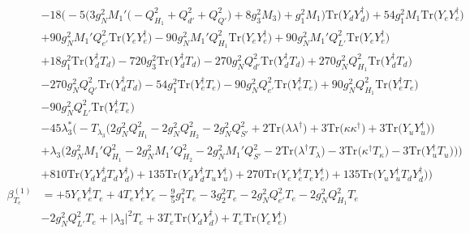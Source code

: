 {\begin{align}
 &-18 \Big(-5 \Big(3 g_{N}^{2} M_1' \Big(- Q_{H_1}^{2}  + Q_{d'}^{2} + Q_{Q'}^{2}\Big) + 8 g_{3}^{2} M_3 \Big) + g_{1}^{2} M_1 \Big)\mbox{Tr}\Big({Y_d  Y_{d}^{\dagger}}\Big) +54 g_{1}^{2} M_1 \mbox{Tr}\Big({Y_e  Y_{e}^{\dagger}}\Big) \nonumber \\ 
 &+90 g_{N}^{2} M_1' Q_{e'}^{2} \mbox{Tr}\Big({Y_e  Y_{e}^{\dagger}}\Big) -90 g_{N}^{2} M_1' Q_{H_1}^{2} \mbox{Tr}\Big({Y_e  Y_{e}^{\dagger}}\Big) +90 g_{N}^{2} M_1' Q_{L'}^{2} \mbox{Tr}\Big({Y_e  Y_{e}^{\dagger}}\Big) \nonumber \\ 
 &+18 g_{1}^{2} \mbox{Tr}\Big({Y_{d}^{\dagger}  T_d}\Big) -720 g_{3}^{2} \mbox{Tr}\Big({Y_{d}^{\dagger}  T_d}\Big) -270 g_{N}^{2} Q_{d'}^{2} \mbox{Tr}\Big({Y_{d}^{\dagger}  T_d}\Big) +270 g_{N}^{2} Q_{H_1}^{2} \mbox{Tr}\Big({Y_{d}^{\dagger}  T_d}\Big) \nonumber \\ 
 &-270 g_{N}^{2} Q_{Q'}^{2} \mbox{Tr}\Big({Y_{d}^{\dagger}  T_d}\Big) -54 g_{1}^{2} \mbox{Tr}\Big({Y_{e}^{\dagger}  T_e}\Big) -90 g_{N}^{2} Q_{e'}^{2} \mbox{Tr}\Big({Y_{e}^{\dagger}  T_e}\Big) +90 g_{N}^{2} Q_{H_1}^{2} \mbox{Tr}\Big({Y_{e}^{\dagger}  T_e}\Big) \nonumber \\ 
 &-90 g_{N}^{2} Q_{L'}^{2} \mbox{Tr}\Big({Y_{e}^{\dagger}  T_e}\Big) \nonumber \\ 
 &-45 \lambda_3^* \Big(- T_{\lambda_3} \Big(2 g_{N}^{2} Q_{H_1}^{2}  -2 g_{N}^{2} Q_{H_2}^{2}  -2 g_{N}^{2} Q_{S'}^{2}  + 2 \mbox{Tr}\Big({\lambda  \lambda^{\dagger}}\Big)  + 3 \mbox{Tr}\Big({\kappa  \kappa^{\dagger}}\Big)  + 3 \mbox{Tr}\Big({Y_u  Y_{u}^{\dagger}}\Big) \Big)\nonumber \\ 
 &+\lambda_3 \Big(2 g_{N}^{2} M_1' Q_{H_1}^{2}  -2 g_{N}^{2} M_1' Q_{H_2}^{2}  -2 g_{N}^{2} M_1' Q_{S'}^{2}  -2 \mbox{Tr}\Big({\lambda^{\dagger}  T_{\lambda}}\Big)  -3 \mbox{Tr}\Big({\kappa^{\dagger}  T_{\kappa}}\Big)  -3 \mbox{Tr}\Big({Y_{u}^{\dagger}  T_u}\Big) \Big)\Big)\nonumber \\ 
 &+810 \mbox{Tr}\Big({Y_d  Y_{d}^{\dagger}  T_d  Y_{d}^{\dagger}}\Big) +135 \mbox{Tr}\Big({Y_d  Y_{d}^{\dagger}  T_u  Y_{u}^{\dagger}}\Big) +270 \mbox{Tr}\Big({Y_e  Y_{e}^{\dagger}  T_e  Y_{e}^{\dagger}}\Big) +135 \mbox{Tr}\Big({Y_u  Y_{u}^{\dagger}  T_d  Y_{d}^{\dagger}}\Big) \Big)\\ 
\beta_{T_e}^{(1)} & =  
+5 {Y_e  Y_{e}^{\dagger}  T_e} +4 {T_e  Y_{e}^{\dagger}  Y_e} -\frac{9}{5} g_{1}^{2} T_e -3 g_{2}^{2} T_e -2 g_{N}^{2} Q_{e'}^{2} T_e -2 g_{N}^{2} Q_{H_1}^{2} T_e \nonumber \\ 
 &-2 g_{N}^{2} Q_{L'}^{2} T_e +|\lambda_3|^2 T_e +3 T_e \mbox{Tr}\Big({Y_d  Y_{d}^{\dagger}}\Big) +T_e \mbox{Tr}\Big({Y_e  Y_{e}^{\dagger}}\Big) \nonumber \\ 

\end{align}}
